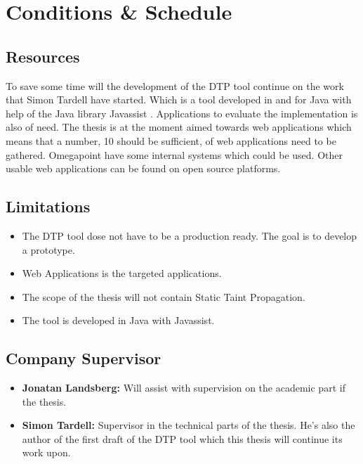 \documentclass{../kththesis}
\begin{document}
\chapter{Conditions \& Schedule}
\section{Resources}
To save some time will the development of the DTP tool continue on the work that Simon Tardell have started. Which is a tool developed in and for Java with help of the Java library Javassist \parencite{javassist}. Applications to evaluate the implementation is also of need. The thesis is at the moment aimed towards web applications which means that a number, 10 should be sufficient, of web applications need to be gathered. Omegapoint have some internal systems which could be used. Other usable web applications can be found on open source platforms.


\section{Limitations}
\begin{itemize}  
	\item The DTP tool dose not have to be a production ready. The goal is to develop a prototype.
	\item Web Applications is the targeted applications.
	\item The scope of the thesis will not contain Static Taint Propagation.
	\item The tool is developed in Java with Javassist.
\end{itemize}


\section{Company Supervisor}
\begin{itemize}
	\item \textbf{Jonatan Landsberg:} Will assist with supervision on the academic part if the thesis.
	\item \textbf{Simon Tardell:} Supervisor in the technical parts of the thesis. He's also the author of the first draft of the DTP tool which this thesis will continue its work upon. 
\end{itemize}
\end{document}
